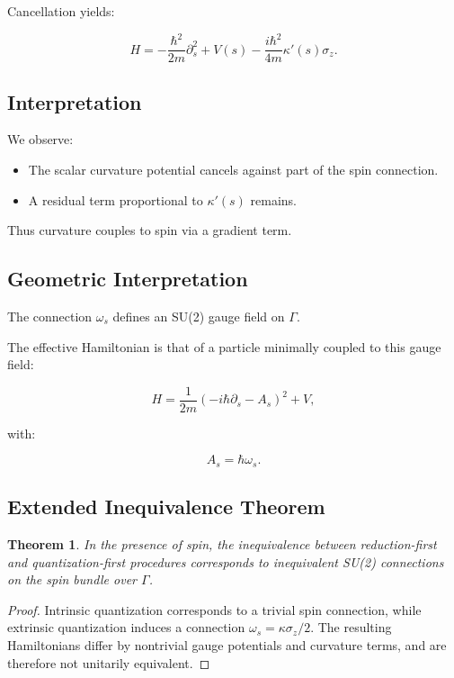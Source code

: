 \documentclass[11pt]{article}
\newtheorem{theorem}{Theorem}[section]
\begin{document}
Cancellation yields:

\begin{equation}
H =
-\frac{\hbar^2}{2m}\partial_s^2
+ V(s)
- \frac{i\hbar^2}{4m}\kappa'(s)\sigma_z.
\end{equation}

\subsection{Interpretation}

We observe:

\begin{itemize}
\item The scalar curvature potential cancels against part of the spin connection.
\item A residual term proportional to $\kappa'(s)$ remains.
\end{itemize}

Thus curvature couples to spin via a gradient term.

\subsection{Geometric Interpretation}

The connection $\omega_s$ defines an SU(2) gauge field on $\Gamma$.

The effective Hamiltonian is that of a particle minimally coupled to this gauge field:

\[
H = \frac{1}{2m}(-i\hbar \partial_s - A_s)^2 + V,
\]

with:

\[
A_s = \hbar \omega_s.
\]

\subsection{Extended Inequivalence Theorem}

\begin{theorem}
In the presence of spin, the inequivalence between reduction-first and quantization-first procedures corresponds to inequivalent SU(2) connections on the spin bundle over $\Gamma$.
\end{theorem}

\begin{proof}
Intrinsic quantization corresponds to a trivial spin connection, while extrinsic quantization induces a connection $\omega_s = \kappa \sigma_z/2$. The resulting Hamiltonians differ by nontrivial gauge potentials and curvature terms, and are therefore not unitarily equivalent.
\end{proof}
\end{document}

